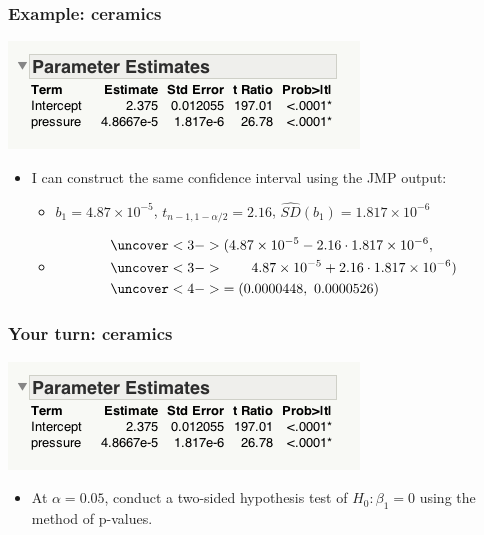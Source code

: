 \documentclass[handout]{beamer}\usepackage[]{graphicx}\usepackage[]{color}
\providecommand{\wh}[1]{\widehat{#1}}
\numberwithin{equation}{section}
\begin{document}
\begin{frame}
\frametitle{Example: ceramics}
\begin{center}
 \includegraphics{../../fig/jmpcerparams.png}
\end{center}
\begin{itemize}
\item I can construct the same confidence interval using the JMP output:
\begin{itemize}
\pause \item $b_1 = 4.87 \times 10^{-5}$, $t_{n - 1, 1 - \alpha/2} = 2.16$, $\wh{SD}(b_1) = 1.817 \times 10^{-6}$
\item 
\begin{align*}
&\uncover<3->{(4.87 \times 10^{-5} - 2.16 \cdot 1.817 \times 10^{-6},} \\
 &\uncover<3->{ \qquad 4.87 \times 10^{-5} + 2.16 \cdot 1.817 \times 10^{-6})} \\
&\uncover<4->{= (0.0000448, \ 0.0000526)}
\end{align*}
\end{itemize}
\end{itemize}
\end{frame}


\begin{frame}
\frametitle{Your turn: ceramics}
\begin{center}
 \includegraphics{../../fig/jmpcerparams.png}
\end{center}

\begin{itemize}
\item At $\alpha = 0.05$, conduct a two-sided hypothesis test of $H_0: \beta_1 = 0$ using the method of p-values.
\end{itemize}
\end{frame}
\end{document}
